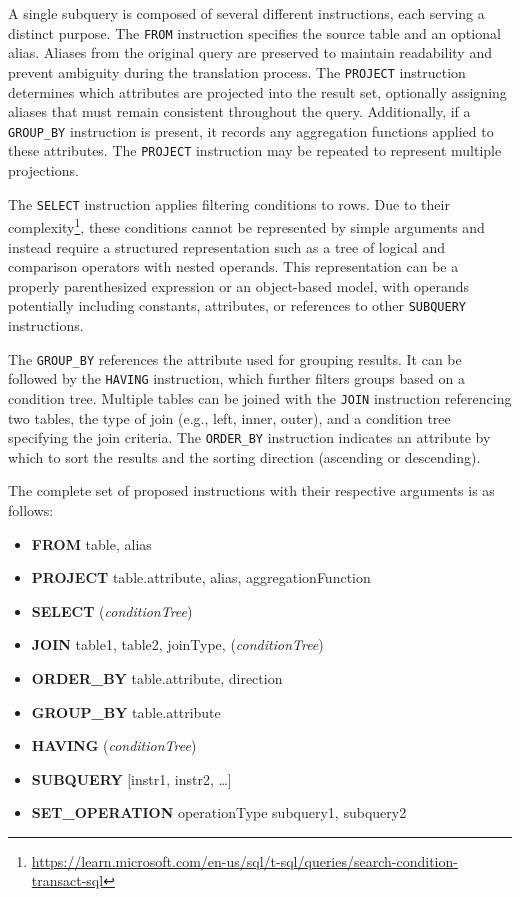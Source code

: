 A single subquery is composed of several different instructions, each serving a distinct purpose. The \texttt{FROM} instruction specifies the source table and an optional alias. Aliases from the original query are preserved to maintain readability and prevent ambiguity during the translation process. The \texttt{PROJECT} instruction determines which attributes are projected into the result set, optionally assigning aliases that must remain consistent throughout the query. Additionally, if a \texttt{GROUP\_BY} instruction is present, it records any aggregation functions applied to these attributes. The \texttt{PROJECT} instruction may be repeated to represent multiple projections. 

The \texttt{SELECT} instruction applies filtering conditions to rows. Due to their complexity\footnote{\url{https://learn.microsoft.com/en-us/sql/t-sql/queries/search-condition-transact-sql}}, these conditions cannot be represented by simple arguments and instead require a structured representation such as a tree of logical and comparison operators with nested operands. This representation can be a properly parenthesized expression or an object-based model, with operands potentially including constants, attributes, or references to other \texttt{SUBQUERY} instructions.

The \texttt{GROUP\_BY} references the attribute used for grouping results. It can be followed by the \texttt{HAVING} instruction, which further filters groups based on a condition tree. 
Multiple tables can be joined with the \texttt{JOIN} instruction referencing two tables, the type of join (e.g., left, inner, outer), and a condition tree specifying the join criteria. 
The \texttt{ORDER\_BY} instruction indicates an attribute by which to sort the results and the sorting direction (ascending or descending).

The complete set of proposed instructions with their respective arguments is as follows:
\begin{itemize}
    \item \textbf{FROM} table, alias
    \item \textbf{PROJECT} table.attribute, alias, aggregationFunction
    \item \textbf{SELECT} (\textit{conditionTree})
    \item \textbf{JOIN} table1, table2, joinType, (\textit{conditionTree})
    \item \textbf{ORDER\_BY} table.attribute, direction
    \item \textbf{GROUP\_BY} table.attribute
    \item \textbf{HAVING} (\textit{conditionTree})
    \item \textbf{SUBQUERY} [instr1, instr2, \ldots]
    \item \textbf{SET\_OPERATION} operationType subquery1, subquery2
\end{itemize}

